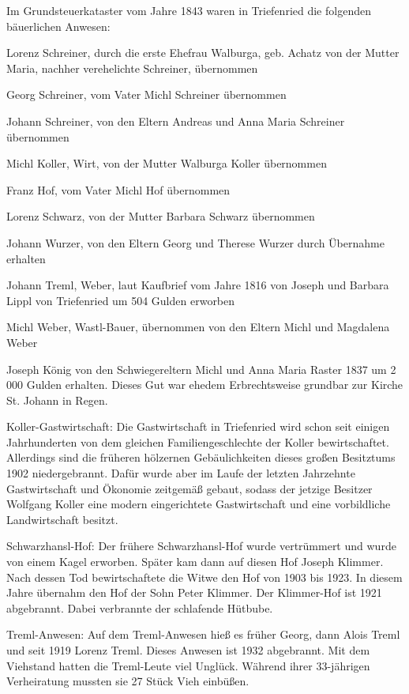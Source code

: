 \documentclass{book}
\begin{document}
Im Grundsteuerkataster vom Jahre 1843 waren in Triefenried die folgenden
bäuerlichen Anwesen:



Lorenz Schreiner, durch die erste Ehefrau Walburga, geb. Achatz von der Mutter
Maria, nachher verehelichte Schreiner, übernommen

Georg Schreiner, vom Vater Michl Schreiner übernommen

Johann Schreiner, von den Eltern Andreas und Anna Maria Schreiner übernommen

Michl Koller, Wirt, von der Mutter Walburga Koller übernommen

Franz Hof, vom Vater Michl Hof übernommen

Lorenz Schwarz, von der Mutter Barbara Schwarz übernommen

Johann Wurzer, von den Eltern Georg und Therese Wurzer durch Übernahme erhalten

Johann Treml, Weber, laut Kaufbrief vom Jahre 1816 von Joseph und Barbara Lippl
von Triefenried um 504 Gulden erworben

Michl Weber, Wastl-Bauer, übernommen von den Eltern Michl und Magdalena Weber

Joseph König von den Schwiegereltern Michl und Anna Maria Raster 1837 um 2 000
Gulden erhalten. Dieses Gut war ehedem Erbrechtsweise grundbar zur Kirche St.
Johann in Regen.



Koller-Gastwirtschaft: Die Gastwirtschaft in Triefenried wird schon seit einigen
Jahrhunderten von dem gleichen Familiengeschlechte der Koller bewirtschaftet.
Allerdings sind die früheren hölzernen Gebäulichkeiten dieses großen Besitztums
1902 niedergebrannt. Dafür wurde aber im Laufe der letzten Jahrzehnte
Gastwirtschaft und Ökonomie zeitgemäß gebaut, sodass der jetzige Besitzer
Wolfgang Koller eine modern eingerichtete Gastwirtschaft und eine vorbildliche
Landwirtschaft besitzt.

Schwarzhansl-Hof: Der frühere Schwarzhansl-Hof wurde vertrümmert und wurde von
einem Kagel erworben. Später kam dann auf diesen Hof Joseph Klimmer. Nach dessen
Tod bewirtschaftete die Witwe den Hof von 1903 bis 1923. In diesem Jahre
übernahm den Hof der Sohn Peter Klimmer. Der Klimmer-Hof ist 1921 abgebrannt.
Dabei verbrannte der schlafende Hütbube.

Treml-Anwesen: Auf dem Treml-Anwesen hieß es früher Georg, dann Alois Treml und
seit 1919 Lorenz Treml. Dieses Anwesen ist 1932 abgebrannt. Mit dem Viehstand
hatten die Treml-Leute viel Unglück. Während ihrer 33-jährigen Verheiratung
mussten sie 27 Stück Vieh einbüßen.
\end{document}
